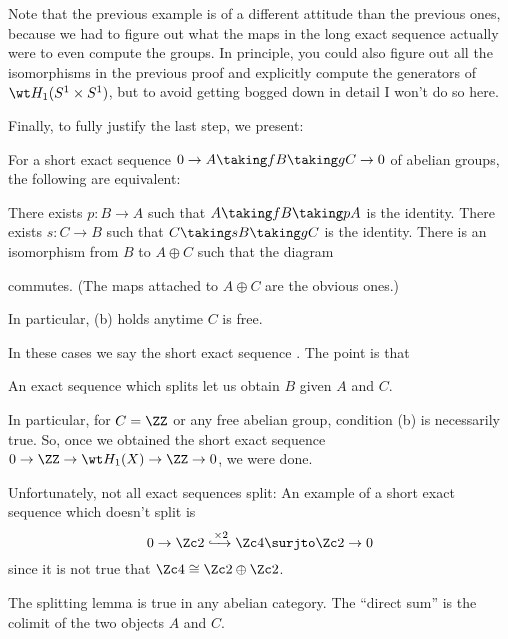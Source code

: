 Note that the previous example is of a different attitude than the previous ones,
because we had to figure out what the maps in the long exact sequence actually were
to even compute the groups.
In principle, you could also figure out all the isomorphisms in the previous proof
and explicitly compute the generators of $\wt H_1(S^1 \times S^1)$,
but to avoid getting bogged down in detail I won't do so here.

Finally, to fully justify the last step, we present:
\begin{lemma}
	\label{lem:split_exact}
	For a short exact sequence $0 \to A \taking f B \taking g C \to 0$
	of abelian groups, the following are equivalent:
	\begin{enumerate}[(a)]
		\ii There exists $p \colon B \to A$ such that $A \taking f B \taking p A$ is the identity.
		\ii There exists $s \colon C \to B$ such that $C \taking s B \taking g C$ is the identity.
		\ii There is an isomorphism from $B$ to $A \oplus C$ such that the diagram
		\begin{center}
		\end{center}
		commutes. (The maps attached to $A \oplus C$ are the obvious ones.)
	\end{enumerate}
	In particular, (b) holds anytime $C$ is free.
\end{lemma}
In these cases we say the short exact sequence . The point is that
\begin{moral}
	An exact sequence which splits let us obtain $B$ given $A$ and $C$.
\end{moral}
In particular, for $C = \ZZ$ or any free abelian group,
condition (b) is necessarily true.
So, once we obtained the short exact sequence $0 \to \ZZ \to \wt H_1(X) \to \ZZ \to 0$,
we were done.
\begin{remark}
	Unfortunately, not all exact sequences split:
	An example of a short exact sequence which doesn't split is
	\[ 0 \to \Zc 2 \xhookrightarrow{\times 2} \Zc 4 \surjto \Zc 2 \to 0 \]
	since it is not true that $\Zc 4 \cong \Zc2 \oplus \Zc 2$.
\end{remark}
\begin{remark}
	The splitting lemma is true in any abelian category.
	The ``direct sum'' is the colimit of the two objects $A$ and $C$.
\end{remark}

